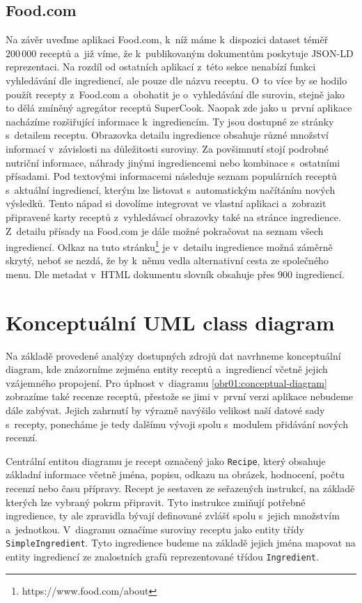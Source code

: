 \subsection{Food.com}

Na závěr uveďme aplikaci Food.com, k~níž máme k~dispozici dataset téměř $200\,000$ receptů a~již víme, že k~publikovaným dokumentům poskytuje JSON-LD reprezentaci. Na rozdíl od ostatních aplikací z~této sekce nenabízí funkci vyhledávání dle ingrediencí, ale pouze dle názvu receptu. O~to více by se hodilo použít recepty z~Food.com a~obohatit je o~vyhledávání dle surovin, stejně jako to dělá zmíněný agregátor receptů SuperCook. Naopak zde jako u~první aplikace nacházíme rozšiřující informace k~ingrediencím. Ty jsou dostupné ze stránky s~detailem receptu. Obrazovka detailu ingredience obsahuje různé množství informací v~závislosti na důležitosti suroviny. Za povšimnutí stojí podrobné nutriční informace, náhrady jinými ingrediencemi nebo kombinace s~ostatními přísadami. Pod textovými informacemi následuje seznam populárních receptů s~aktuální ingrediencí, kterým lze listovat s~automatickým načítáním nových výsledků. Tento nápad si dovolíme integrovat ve vlastní aplikaci a~zobrazit připravené karty receptů z~vyhledávací obrazovky také na stránce ingredience. Z~detailu přísady na Food.com je dále možné pokračovat na seznam všech ingrediencí. Odkaz na tuto stránku\footnote{https://www.food.com/about} je v~detailu ingredience možná záměrně skrytý, neboť se nezdá, že by k~němu vedla alternativní cesta ze společného menu. Dle metadat v~HTML dokumentu slovník obsahuje přes $900$ ingrediencí.

\section{Konceptuální UML class diagram}

Na základě provedené analýzy dostupných zdrojů dat navrhneme konceptuální diagram, kde znázorníme zejména entity receptů a~ingrediencí včetně jejich vzájemného propojení. Pro úplnost v~diagramu \ref{obr01:conceptual-diagram} zobrazíme také recenze receptů, přestože se jimi v~první verzi aplikace nebudeme dále zabývat. Jejich zahrnutí by výrazně navýšilo velikost naší datové sady s~recepty, ponecháme je tedy dalšímu vývoji spolu s~modulem přidávání nových recenzí.

Centrální entitou diagramu je recept označený jako \texttt{Recipe}, který obsahuje základní informace včetně jména, popisu, odkazu na obrázek, hodnocení, počtu recenzí nebo času přípravy. Recept je sestaven ze seřazených instrukcí, na základě kterých lze vybraný pokrm připravit. Tyto instrukce zmiňují potřebné ingredience, ty ale zpravidla bývají definované zvlášť spolu s~jejich množstvím a~jednotkou. V~diagramu označíme suroviny receptu jako entity třídy \texttt{SimpleIngredient}. Tyto ingredience budeme na základě jejich jména mapovat na entity ingrediencí ze znalostních grafů reprezentované třídou \texttt{Ingredient}.


